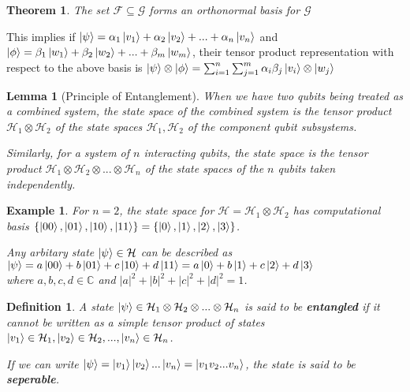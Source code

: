 \documentclass[12pt,twoside,fleqn]{report}
\theoremstyle{thmstyle}
\newtheorem{defn}{Definition}[chapter]
\newtheorem{thm}{Theorem}[chapter]
\newtheorem{eg}{Example}[chapter]
\newtheorem{lemma}{Lemma}[chapter]
\begin{document}
\begin{thm}

    The set $\mathcal{F} \subseteq \mathcal{G}$ forms an orthonormal basis for $\mathcal{G}$

\end{thm}

This implies if $\ket{\psi} = \alpha_1 \ket{v_1} + \alpha_2 \ket{v_2} + ... + \alpha_n \ket{v_n}$ and $\ket{\phi} = \beta_1 \ket{w_1} + \beta_2 \ket{w_2} + ... + \beta_m \ket{w_m}$, their tensor product representation with respect to the above basis is $\ket{\psi} \otimes \ket{\phi} = \sum_{i=1}^n \sum_{j=1}^m \alpha_i \beta_j \ket{v_i} \otimes \ket{w_j}$


\begin{samepage}
    \begin{mdframed}
\begin{lemma}[Principle of Entanglement]
When we have two qubits being treated as a combined system, the state space of the combined system is the tensor product $\mathcal{H}_1 \otimes \mathcal{H}_2$ of the state spaces $\mathcal{H}_1, \mathcal{H}_2$ of the component qubit subsystems. 

    Similarly, for a system of $n$ interacting qubits, the state space is the tensor product $\mathcal{H}_1 \otimes \mathcal{H}_2 \otimes ... \otimes \mathcal{H}_n$ of the state spaces of the $n$ qubits taken independently.
\end{lemma}
    \end{mdframed}
\end{samepage}

\begin{eg}
For $n=2$, the state space for $\mathcal{H} = \mathcal{H}_1 \otimes \mathcal{H}_2$ has computational basis $\{ \ket{00}, \ket{01}, \ket{10}, \ket{11} \} = \{ \ket{0}, \ket{1}, \ket{2}, \ket{3} \}$.

    Any arbitary state $\ket{\psi} \in \mathcal{H}$ can be described as $\ket{\psi} = a \ket{00} + b \ket{01} + c \ket{10} + d \ket{11} = a \ket{0} + b \ket{1} + c \ket{2} + d \ket{3}$ \\ where $a, b, c, d \in \mathbb{C}$ and $|a|^2 + |b|^2 + |c|^2 + |d|^2 = 1$.
\end{eg}


\begin{defn}
    A state $\ket{\psi} \in \mathcal{H}_1 \otimes \mathcal{H}_2 \otimes ... \otimes \mathcal{H}_n$ is said to be \textbf{entangled} if it cannot be written as a simple tensor product of states $\ket{v_1} \in \mathcal{H}_1, \ket{v_2} \in \mathcal{H}_2, ..., \ket{v_n} \in \mathcal{H}_n$. 

    If we can write $\ket{\psi} = \ket{v_1}\ket{v_2}...\ket{v_n} = \ket{v_1 v_2...v_n}$, the state is said to be \textbf{seperable}.
\end{defn}
\end{document}
